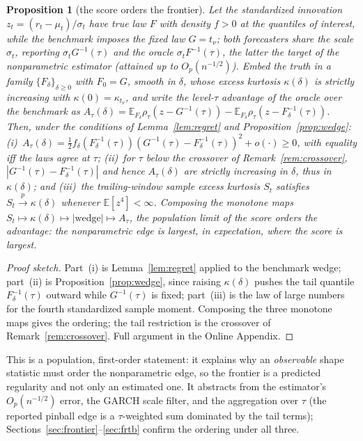 \documentclass[11pt]{article}
\newtheorem{proposition}{Proposition}
\theoremstyle{remark}
\begin{document}
\begin{proposition}[the score orders the frontier]\label{prop:scorefrontier}
Let the standardized innovation $z_t=(r_t-\mu_t)/\sigma_t$ have true law
$F$ with density $f>0$ at the quantiles of interest, while the benchmark
imposes the fixed law $G=t_\nu$; both forecasters share the scale
$\sigma_t$, reporting $\sigma_t G^{-1}(\tau)$ and the oracle
$\sigma_t F^{-1}(\tau)$, the latter the target of the nonparametric
estimator (attained up to $O_p(n^{-1/2})$). Embed the truth in a family
$\{F_\delta\}_{\delta\ge0}$ with $F_0=G$, smooth in $\delta$, whose excess
kurtosis $\kappa(\delta)$ is strictly increasing with
$\kappa(0)=\kappa_{t_\nu}$, and write the level-$\tau$ advantage of the
oracle over the benchmark as
$A_\tau(\delta)=\mathbb{E}_{F_\delta}\rho_\tau(z-G^{-1}(\tau))
-\mathbb{E}_{F_\delta}\rho_\tau(z-F_\delta^{-1}(\tau))$. Then, under the
conditions of Lemma~\ref{lem:regret} and Proposition~\ref{prop:wedge}:
\emph{(i)}~$A_\tau(\delta)=\tfrac12
f_\delta(F_\delta^{-1}(\tau))(G^{-1}(\tau)-F_\delta^{-1}(\tau))^2+o(\cdot)\ge0$,
with equality iff the laws agree at $\tau$; \emph{(ii)}~for $\tau$ below
the crossover of Remark~\ref{rem:crossover},
$|G^{-1}(\tau)-F_\delta^{-1}(\tau)|$ and hence $A_\tau(\delta)$ are
strictly increasing in $\delta$, thus in $\kappa(\delta)$; and
\emph{(iii)}~the trailing-window sample excess kurtosis $S_t$ satisfies
$S_t\xrightarrow{p}\kappa(\delta)$ whenever $\mathbb{E}[z^4]<\infty$.
Composing the monotone maps
$S_t\mapsto\kappa(\delta)\mapsto|\text{wedge}|\mapsto A_\tau$, the
population limit of the score orders the advantage: the nonparametric
edge is largest, in expectation, where the score is largest.
\end{proposition}
\begin{proof}[Proof sketch]
Part~(i) is Lemma~\ref{lem:regret} applied to the benchmark wedge;
part~(ii) is Proposition~\ref{prop:wedge}, since raising $\kappa(\delta)$
pushes the tail quantile $F_\delta^{-1}(\tau)$ outward while $G^{-1}(\tau)$
is fixed; part~(iii) is the law of large numbers for the fourth
standardized sample moment. Composing the three monotone maps gives the
ordering; the tail restriction is the crossover of
Remark~\ref{rem:crossover}. Full argument in the Online Appendix.
\end{proof}

\medskip\noindent This is a population, first-order statement: it
explains why an \emph{observable} shape statistic must order the
nonparametric edge, so the frontier is a predicted regularity and not
only an estimated one. It abstracts from the estimator's $O_p(n^{-1/2})$
error, the GARCH scale filter, and the aggregation over $\tau$ (the
reported pinball edge is a $\tau$-weighted sum dominated by the tail
terms); Sections~\ref{sec:frontier}--\ref{sec:frtb} confirm the ordering
under all three.
\end{document}
